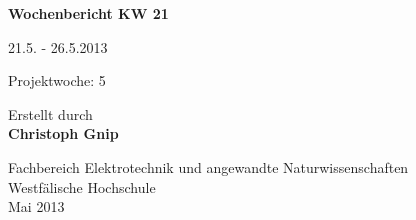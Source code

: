 
\begin{center}
{\Huge \textbf{Wochenbericht KW 21}\par}
\vspace{1cm}
{\Huge 21.5. - 26.5.2013\par}
\vspace{1cm}
{\Huge Projektwoche: 5\par}

\vspace{2cm}

\large{Erstellt durch}\\
\Large{\textbf{Christoph Gnip}}


\vfill

{\normalsize Fachbereich Elektrotechnik und angewandte Naturwissenschaften\\
Westfälische Hochschule\\[2ex]Mai 2013}


\end{center}
\newpage